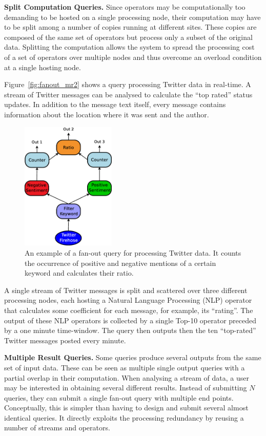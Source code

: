 \textbf{Split Computation Queries.} 
Since operators may be computationally too demanding to be hosted on a single processing node, their
computation may have to be split among a number of copies running at different sites. These
copies are composed of the same set of operators but process only a subset of the original data.
Splitting the computation allows the system to spread the processing cost of a set of operators over
multiple nodes and thus overcome an overload condition at a single hosting node. 

\ex Figure~\ref{fig:fanout_mr2} shows a query processing Twitter data in
real-time. A stream of Twitter messages can be analysed to calculate the ``top rated'' status updates.
In addition to the message text itself, every message contains information about the location where it
was sent and the author.
\begin{figure}[t]
	\centering
	\includegraphics[width=0.4\textwidth]{img/tesi/fan-out_2_senza} 
	\caption{An example of a fan-out query for processing Twitter data. It counts the occurrence of positive
	and negative mentions of a certain keyword and calculates their ratio.}
	\label{fig:query_fanouts3}
\end{figure}
A single stream of Twitter messages is split and scattered over three different processing nodes, each
hosting a Natural Language Processing (NLP) operator that calculates some coefficient for each message,
for example, its ``rating''. The output of these NLP operators is collected by a single Top-10
operator preceded by a one minute time-window. The query then outputs then the ten ``top-rated'' Twitter
messages posted every minute. 

\textbf{Multiple Result Queries.} Some queries produce several outputs from the same set of
input data.
These can be seen as multiple single output queries with a partial overlap in their computation. When analysing a
stream of data, a user may be interested in obtaining several different results. Instead of submitting
$N$ queries, they can submit a single fan-out query with multiple end points. Conceptually, this is
simpler than having to design and submit several almost identical queries. It directly exploits the
processing redundancy by reusing a number of streams and operators.


